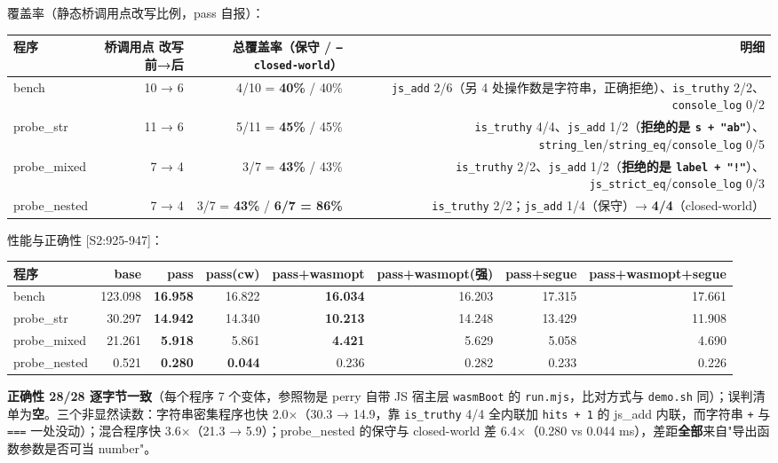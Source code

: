 \documentclass[11pt, a4paper]{article}
\begin{document}
覆盖率（静态桥调用点改写比例，pass 自报）：


\begin{center}\small\begin{tabular}{lrrr}
\toprule
程序 & 桥调用点 改写前→后 & 总覆盖率（保守 / \texttt{--closed-world}） & 明细 \\
\midrule
bench & 10 → 6 & 4/10 = \textbf{40\%} / 40\% & \texttt{js\_add} 2/6（另 4 处操作数是字符串，正确拒绝）、\texttt{is\_truthy} 2/2、\texttt{console\_log} 0/2 \\
probe\_str & 11 → 6 & 5/11 = \textbf{45\%} / 45\% & \texttt{is\_truthy} 4/4、\texttt{js\_add} 1/2（\textbf{拒绝的是 \texttt{s + "ab"}}）、\texttt{string\_len}/\texttt{string\_eq}/\texttt{console\_log} 0/5 \\
probe\_mixed & 7 → 4 & 3/7 = \textbf{43\%} / 43\% & \texttt{is\_truthy} 2/2、\texttt{js\_add} 1/2（\textbf{拒绝的是 \texttt{label + "!"}}）、\texttt{js\_strict\_eq}/\texttt{console\_log} 0/3 \\
probe\_nested & 7 → 4 & 3/7 = \textbf{43\%} / \textbf{6/7 = 86\%} & \texttt{is\_truthy} 2/2；\texttt{js\_add} 1/4（保守）→ \textbf{4/4}（closed-world） \\
\bottomrule
\end{tabular}\end{center}


性能与正确性 [S2:925-947]：


\begin{center}\small\begin{tabular}{lrrrrrrr}
\toprule
程序 & base & pass & pass(cw) & pass+wasmopt & pass+wasmopt(强) & pass+segue & pass+wasmopt+segue \\
\midrule
bench & 123.098 & \textbf{16.958} & 16.822 & \textbf{16.034} & 16.203 & 17.315 & 17.661 \\
probe\_str & 30.297 & \textbf{14.942} & 14.340 & \textbf{10.213} & 14.248 & 13.429 & 11.908 \\
probe\_mixed & 21.261 & \textbf{5.918} & 5.861 & \textbf{4.421} & 5.629 & 5.058 & 4.690 \\
probe\_nested & 0.521 & \textbf{0.280} & \textbf{0.044} & 0.236 & 0.282 & 0.233 & 0.226 \\
\bottomrule
\end{tabular}\end{center}


\textbf{正确性 28/28 逐字节一致}（每个程序 7 个变体，参照物是 perry 自带 JS 宿主层 \texttt{wasmBoot} 的 \texttt{run.mjs}，比对方式与 \texttt{demo.sh} 同）；误判清单为\textbf{空}。三个非显然读数：字符串密集程序也快 2.0×（30.3 → 14.9，靠 \texttt{is\_truthy} 4/4 全内联加 \texttt{hits + 1} 的 js\_add 内联，而字符串 \texttt{+} 与 \texttt{===} 一处没动）；混合程序快 3.6×（21.3 → 5.9）；probe\_nested 的保守与 closed-world 差 6.4×（0.280 vs 0.044 ms），差距\textbf{全部}来自"导出函数参数是否可当 number"。
\end{document}

